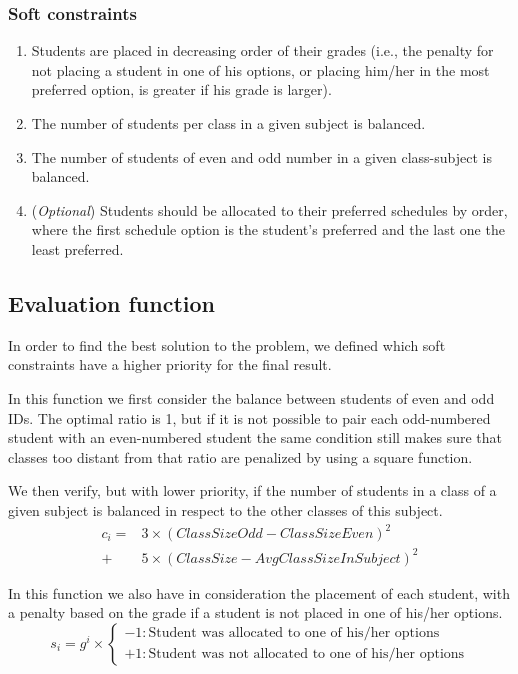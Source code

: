 \documentclass[runningheads]{llncs}
\begin{document}
\subsubsection{Soft constraints}
\begin{enumerate}
    \item Students are placed in decreasing order of their grades (i.e., the penalty for not placing a student in one of his options, or placing him/her in the most preferred option, is greater if his grade is larger).
    \item The number of students per class in a given subject is balanced.
    \item The number of students of even and odd number in a given class-subject is balanced.
    \item (\textit{Optional}) Students should be allocated to their preferred schedules by order, where the first schedule option is the student's preferred and the last one the least preferred.
\end{enumerate}

\subsection{Evaluation function}

In order to find the best solution to the problem, we defined which soft constraints have a higher priority for the final result.

In this function we first consider the balance between students of even and odd IDs. The optimal ratio is 1, but if it is not possible to pair each odd-numbered student with an even-numbered student the same condition still makes sure that classes too distant from that ratio are penalized by using a square function. 

We then verify, but with lower priority, if the number of students in a class of a given subject is balanced in respect to the other classes of this subject.
\begin{equation}
\begin{aligned}
    c_i = & 3 \times \left(ClassSizeOdd - ClassSizeEven\right)^2 \\
        + & 5 \times \left(ClassSize - AvgClassSizeInSubject\right)^2
\end{aligned}
\end{equation}

In this function we also have in consideration the placement of each student, with a penalty based on the grade if a student is not placed in one of his/her options.
\begin{equation}
    s_i = g^i \times \begin{cases}
        -1 : \text{Student was allocated to one of his/her options} \\
        +1 : \text{Student was not allocated to one of his/her options}
    \end{cases}
\end{equation}
\end{document}
